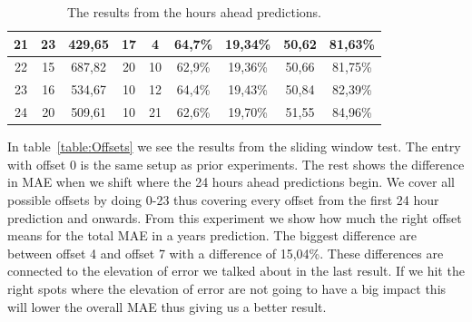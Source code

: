\begin{table}[H]
{\begin{tabular}{|c|c|c|c|c|c|c|c|c|}
	21 & 23  & 429,65 & 17 & 4  & 64,7\% & 19,34\% & 50,62 & 81,63\% \\ \hline
	22 & 15  & 687,82 & 20 & 10 & 62,9\% & 19,36\% & 50,66 & 81,75\% \\ \hline
	23 & 16  & 534,67 & 10 & 12 & 64,4\% & 19,43\% & 50,84 & 82,39\% \\ \hline
	24 & 20  & 509,61 & 10 & 21 & 62,6\% & 19,70\% & 51,55 & 84,96\% \\ \hline
	\end{tabular}
}
\caption{The results from the hours ahead predictions.} %
\label{table:XHoursAhead} %
\end{table}

In table~\ref{table:Offsets} we see the results from the sliding window test. The entry with offset 0 is the same setup as prior experiments. The rest shows the difference in MAE when we shift where the 24 hours ahead predictions begin. We cover all possible offsets by doing 0-23 thus covering every offset from the first 24 hour prediction and onwards. From this experiment we show how much the right offset means for the total MAE in a years prediction. The biggest difference are between offset 4 and offset 7 with a difference of 15,04\%. These differences are connected to the elevation of error we talked about in the last result. If we hit the right spots where the elevation of error are not going to have a big impact this will lower the overall MAE thus giving us a better result.

